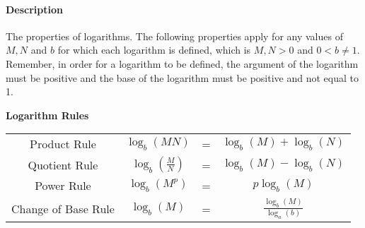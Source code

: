 \documentclass[12pt]{article}
\begin{document}
\paragraph{Description} The properties of logarithms. The following
properties apply for any values of $M, N$ and $b$ for which each logarithm is
defined, which is $M,N > 0$ and $0 < b \ne 1$. Remember, in order for a
logarithm to be defined, the argument of the logarithm must be positive and
the base of the logarithm must be positive and not equal to 1.

{ %

  \begin{center}

    \textbf{Logarithm Rules} \vspace{3mm} \\
    \large \def\arraystretch{2} %

    \begin{tabular}{cccc}

      Product Rule & $\log_{b}(MN)$ & = & $\log_{b}(M) + \log_{b}(N)$ \\

      Quotient Rule & $\log_{b}(\frac{M}{N})$ &
                        = & $\log_{b}(M) - \log_{b}(N)$ \\

      Power Rule & $\log_{b}(M^{p})$ & = & $p\log_{b}(M)$ \\

      Change of Base Rule & $\log_{b}(M)$ &
                        = & $\frac{\log_{b}(M)}{\log_{a}(b)}$ \\

    \end{tabular} \\

  \end{center}

}
\end{document}

